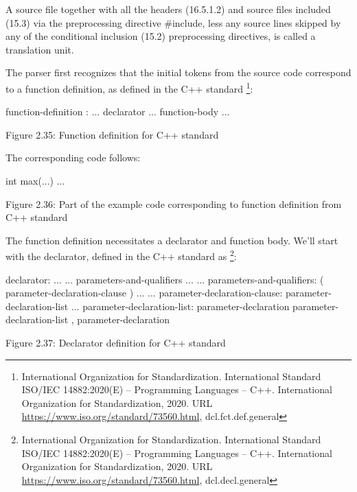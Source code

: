 A source file together with all the headers (16.5.1.2) and source files included (15.3) via the preprocessing directive \#include, less any source lines skipped by any of the conditional inclusion (15.2) preprocessing directives, is called a translation unit.

The parser first recognizes that the initial tokens from the source code correspond to a function definition, as defined in the C++ standard \footnote{International Organization for Standardization. International Standard ISO/IEC 14882:2020(E) – Programming Languages – C++. International Organization for Standardization, 2020. URL \url{https://www.iso.org/standard/73560.html}, dcl.fct.def.general}:

\begin{shell}
function-definition :
    ... declarator ... function-body
    ...
\end{shell}

\begin{center}
Figure 2.35: Function definition for C++ standard
\end{center}

The corresponding code follows:

\begin{cpp}
int max(...) {
  ...
}
\end{cpp}

\begin{center}
Figure 2.36: Part of the example code corresponding to function definition from C++ standard
\end{center}

The function definition necessitates a declarator and function body. We'll start with the declarator, defined in the C++ standard as \footnote{International Organization for Standardization. International Standard ISO/IEC 14882:2020(E) – Programming Languages – C++. International Organization for Standardization, 2020. URL \url{https://www.iso.org/standard/73560.html}, dcl.decl.general}:

\begin{shell}
declarator:
        ...
        ... parameters-and-qualifiers ...
...
parameters-and-qualifiers:
        ( parameter-declaration-clause ) ...
...
parameter-declaration-clause:
        parameter-declaration-list ...
parameter-declaration-list:
        parameter-declaration
        parameter-declaration-list , parameter-declaration
\end{shell}

\begin{center}
Figure 2.37: Declarator definition for C++ standard
\end{center}

